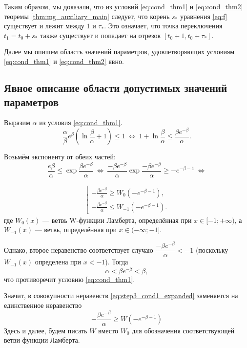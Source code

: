 Таким образом, мы доказали, что из условий \eqref{eq:cond_thm1} и \eqref{eq:cond_thm2} теоремы \ref{thm:mg_auxiliary_main} следует, что корень $s_*$ уравнения \eqref{eq:f} существует и лежит между $1$ и $\tau_*$. Это означает, что точка переключения $t_1 = t_0 + s_*$ также существует и попадает на отрезок $[t_0 + 1, t_0 + \tau_*]$.

Далее мы опишем область значений параметров, удовлетворяющих условиям \eqref{eq:cond_thm1} и \eqref{eq:cond_thm2} явно.

\subsection{Явное описание области допустимых значений параметров}

Выразим $\alpha$ из условия \eqref{eq:cond_thm1}.
\begin{equation*}
\frac{\alpha}{\beta}e^{\beta}\left(\ln\frac{\beta}{\alpha} + 1\right) \leqslant 1\ \Leftrightarrow\ 1 + \ln\dfrac{\beta}{\alpha} \leqslant \dfrac{\beta e^{-\beta}}{\alpha}.
\end{equation*}

Возьмём экспоненту от обеих частей:
\begin{equation*}
\dfrac{e\beta}{\alpha} \leqslant \exp\dfrac{\beta e^{-\beta}}{\alpha}\ \Leftrightarrow\ \dfrac{-\beta e^{-\beta}}{\alpha}\exp \dfrac{-\beta e^{-\beta}}{\alpha} \geqslant -e^{-\beta - 1}\ \Leftrightarrow
\end{equation*}

\begin{align}
\label{eq:step3_cond1_expanded}
\left[
\begin{array}{ll}
	-\frac{\beta e^{-\beta}}{\alpha} \geqslant W_0(-e^{-\beta - 1}),\\
	-\frac{\beta e^{-\beta}}{\alpha} \leqslant W_{-1}(-e^{-\beta - 1}).
\end{array}
\right.
\end{align}
%
где $W_0(x)$ --- ветвь W-функции Ламберта, определённая при $x \in [-1; +\infty)$, а $W_{-1}(x)$ --- ветвь, определённая при $x \in (-\infty; -1]$.

Однако, второе неравенство соответствует случаю $\dfrac{-\beta e^{-\beta}}{\alpha} < -1$ (поскольку $W_{-1}(x)$ определена при $x < -1$). Тогда
\begin{equation*}
\alpha < \beta e^{-\beta} < \beta,
\end{equation*}
что противоречит условию \eqref{eq:cond_thm1}.

Значит, в совокупности неравенств \eqref{eq:step3_cond1_expanded} заменяется на единственное неравенство
\begin{equation}
\label{eq:step3_cond1}
-\frac{\beta e^{-\beta}}{\alpha} \geqslant W(-e^{-\beta - 1})
\end{equation}
Здесь и далее, будем писать $W$ вместо $W_0$ для обозначения соответствующей ветви функции Ламберта.

